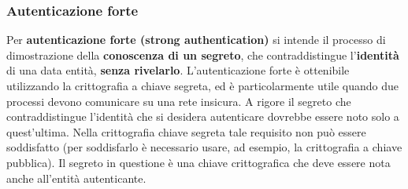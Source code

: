\subsubsection{Autenticazione forte}
Per \textbf{autenticazione forte (strong authentication)} si intende il processo di dimostrazione della \textbf{conoscenza di un segreto}, che contraddistingue l'\textbf{identità} di una data entità, \textbf{senza rivelarlo}. L'autenticazione forte è ottenibile utilizzando la crittografia a chiave segreta, ed è particolarmente utile quando due processi devono comunicare su una rete insicura. A rigore il segreto che contraddistingue l'identità che si desidera autenticare dovrebbe essere noto solo a quest'ultima. Nella crittografia chiave segreta tale requisito non può essere soddisfatto (per soddisfarlo è necessario usare, ad esempio, la crittografia a chiave pubblica). Il segreto in questione è una chiave crittografica che deve essere nota anche all'entità autenticante. 

